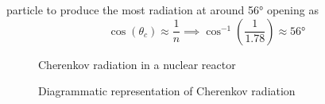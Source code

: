 \documentclass[11pt,a4paper,faculty=we,language=en,doctype=report]{cls/ugent-doc}
\begin{document}
particle to produce the most radiation at around 56° opening as 
\begin{equation}
	\cos(\theta_c) \approx \frac{1}{n} \implies \cos^{-1}\left(\frac{1}{1.78}\right)\approx 56\text{°}
\end{equation}
\begin{figure}
\centering
\begin{minipage}{0.45\textwidth}
	\centering
	\caption{Cherenkov radiation in a nuclear reactor}
	\label{figure: Cherenkov reactor}
\end{minipage}
\hspace{0.05\textwidth}
\begin{minipage}{0.45\textwidth}
	\centering
	\caption{Diagrammatic representation of Cherenkov radiation}
	\label{figure: Cherenkov illustratie}
\end{minipage}
\end{figure}
\end{document}
